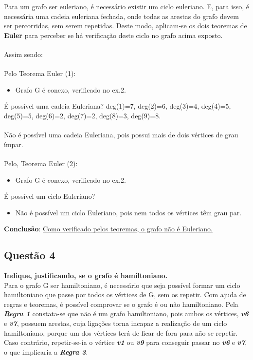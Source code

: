 \documentclass{report}
\begin{document}
Para um grafo ser euleriano, é necessário existir um ciclo euleriano. E, para isso, é necessária uma cadeia euleriana fechada, onde todas as arestas do grafo devem ser percorridas, sem serem repetidas. Deste modo, aplicam-se \underline{os dois teoremas} de \textbf{Euler} para perceber se há verificação deste ciclo no grafo acima exposto. \\
\\ Assim sendo: \\
\\
Pelo Teorema Euler (1): \\ 
\begin{itemize}
\item  Grafo G é conexo, verificado no ex.2.\\
\end{itemize}
É possível uma cadeia Euleriana?
deg(1)=7, deg(2)=6, deg(3)=4, deg(4)=5, deg(5)=5, deg(6)=2, deg(7)=2, deg(8)=3, deg(9)=8.\\
\\Não é possível uma cadeia Euleriana, pois possui mais de dois vértices de grau ímpar.\\
\\
Pelo, Teorema Euler (2):\\
\begin{itemize}
\item Grafo G é conexo, verificado no ex.2.\\
\end{itemize}
É possível um ciclo Euleriano?
\begin{itemize}
\item Não é possível um ciclo Euleriano, pois nem todos os vértices têm grau par.
\end{itemize}
\textbf{Conclusão}: \underline {Como verificado pelos teoremas, o grafo não é Euleriano.}

\subsection{Questão 4}
\textbf{Indique, justificando, se o grafo é hamiltoniano.} \\

Para o grafo G ser hamiltoniano, é necessário que seja possível formar um ciclo hamiltoniano que passe por todos os vértices de G, sem os repetir. Com ajuda de regras e teoremas, é possível comprovar se o grafo é ou não hamiltoniano. Pela \textit{\textbf{Regra 1}} constata-se que não é um grafo hamiltoniano, pois ambos os vértices, \textit{\textbf{v6}} e \textit{\textbf{v7}}, possuem arestas, cuja ligações torna incapaz a realização de um ciclo hamiltoniano, porque um dos vértices terá de ficar de fora para não se repetir. Caso contrário, repetir-se-ia o vértice \textit{\textbf{v1}} ou \textit{\textbf{v9}} para conseguir passar no \textit{\textbf{v6}} e \textit{\textbf{v7}}, o que implicaria a \textit{\textbf{Regra 3}}.
\end{document}

